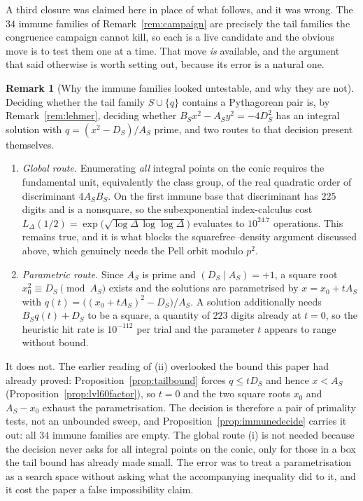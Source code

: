 \documentclass[11pt]{article}
\theoremstyle{definition}
\newtheorem{remark}[theorem]{Remark}
\begin{document}
A third closure was claimed here in place of what follows, and it was wrong. The $34$ immune
families of Remark~\textup{\ref{rem:campaign}} are precisely the tail families the congruence
campaign cannot kill, so each is a live candidate and the obvious move is to test them one at a
time. That move \emph{is} available, and the argument that said otherwise is worth setting out,
because its error is a natural one.

\begin{remark}[Why the immune families looked untestable, and why they are not]\label{rem:untestable}
Deciding whether the tail family $S\cup\{q\}$ contains a Pythagorean pair is, by
Remark~\textup{\ref{rem:lehmer}}, deciding whether $B_Sx^2-A_Sy^2=-4D_S^2$ has an integral solution
with $q=(x^2-D_S)/A_S$ prime, and two routes to that decision present themselves.
\begin{enumerate}[label=\textup{(\roman*)},leftmargin=2.2em]
\item \emph{Global route.} Enumerating \emph{all} integral points on the conic requires the
fundamental unit, equivalently the class group, of the real quadratic order of discriminant
$4A_SB_S$. On the first immune base that discriminant has $225$ digits and is a nonsquare, so the
subexponential index-calculus cost
$L_\Delta(1/2)=\exp\bigl(\sqrt{\log\Delta\,\log\log\Delta}\bigr)$ evaluates to $10^{24.7}$
operations. This remains true, and it is what blocks the squarefree--density argument discussed
above, which genuinely needs the Pell orbit modulo $p^2$.
\item \emph{Parametric route.} Since $A_S$ is prime and $(D_S\mid A_S)=+1$, a square root
$x_0^2\equiv D_S\pmod{A_S}$ exists and the solutions are parametrised by $x=x_0+tA_S$ with
$q(t)=\bigl((x_0+tA_S)^2-D_S\bigr)/A_S$. A solution additionally needs $B_Sq(t)+D_S$ to be a square,
a quantity of $223$ digits already at $t=0$, so the heuristic hit rate is $10^{-112}$ per trial and
the parameter $t$ appears to range without bound.
\end{enumerate}
It does not. The earlier reading of (ii) overlooked the bound this paper had already proved:
Proposition~\ref{prop:tailbound} forces $q\le tD_S$ and hence $x<A_S$
(Proposition~\ref{prop:lvl60factor}), so $t=0$ and the two square roots $x_0$ and $A_S-x_0$ exhaust
the parametrisation. The decision is therefore a pair of primality tests, not an unbounded sweep,
and Proposition~\ref{prop:immunedecide} carries it out: all $34$ immune families are empty. The
global route (i) is not needed because the decision never asks for all integral points on the conic,
only for those in a box the tail bound has already made small. The error was to treat a
parametrisation as a search space without asking what the accompanying inequality did to it, and it
cost the paper a false impossibility claim.
\end{remark}
\end{document}
